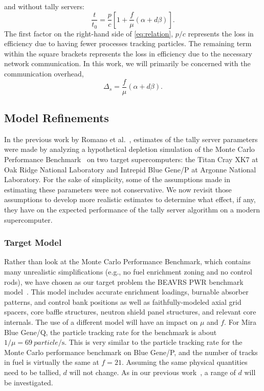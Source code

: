 \documentclass{snamc2013}
\begin{document}
and without tally servers:
\begin{equation}
  \label{eq:relation}
  \frac{t}{t_0} = \frac{p}{c} \left [ 1 + \frac{f}{\mu} \left ( \alpha + d\beta
  \right ) \right ].
\end{equation}
The first factor on the right-hand side of \autoref{eq:relation}, $p/c$
represents the loss in efficiency due to having fewer processes tracking
particles. The remaining term within the square brackets represents the loss in
efficiency due to the necessary network communication. In this work, we will
primarily be concerned with the communication overhead,
\begin{equation}
  \label{eq:overhead}
  \Delta_s = \frac{f}{\mu} \left ( \alpha + d\beta \right ).
\end{equation}

\subsection{Model Refinements}

In the previous work by Romano et al.~\cite{jcp-romano-2013}, estimates of the
tally server parameters were made by analyzing a hypothetical depletion
simulation of the Monte Carlo Performance Benchmark~\cite{mc-hoogenboom-2011} on
two target supercomputers: the Titan Cray XK7 at Oak Ridge National Laboratory
and Intrepid Blue Gene/P at Argonne National Laboratory. For the sake of
simplicity, some of the assumptions made in estimating these parameters were not
conservative. We now revisit those assumptions to develop more realistic
estimates to determine what effect, if any, they have on the expected
performance of the tally server algorithm on a modern supercomputer.

\subsubsection{Target Model}

Rather than look at the Monte Carlo Performance Benchmark, which contains many
unrealistic simplifications (e.g., no fuel enrichment zoning and no control
rods), we have chosen as our target problem the BEAVRS PWR benchmark
model~\cite{mc-horelik-2013}. This model includes accurate enrichment loadings,
burnable absorber patterns, and control bank positions as well as
faithfully-modeled axial grid spacers, core baffle structures, neutron shield
panel structures, and relevant core internals. The use of a different model will
have an impact on $\mu$ and $f$. For Mira Blue Gene/Q, the particle tracking
rate for the benchmark is about $1/\mu = \SI{69}{particle/\second}$. This is
very similar to the particle tracking rate for the Monte Carlo performance
benchmark on Blue Gene/P, and the number of tracks in fuel is virtually the same
at $f = 21$. Assuming the same physical quantities need to be tallied, $d$ will
not change. As in our previous work~\cite{jcp-romano-2013}, a range of $d$ will
be investigated.
\end{document}
